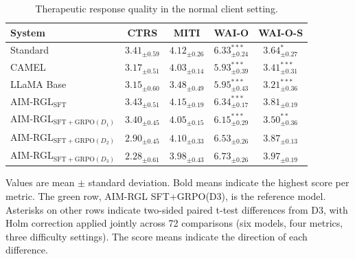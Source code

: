 \begin{table}[H]
\centering
\caption{Therapeutic response quality in the normal client setting.}
\label{tab:main-results-normal}
\small
\setlength{\tabcolsep}{4pt}
\renewcommand{\arraystretch}{1.15}
\begin{tabular}{lcccc}
\toprule
System & CTRS & MITI & WAI-O & WAI-O-S \\
\midrule
Standard & $3.41_{\pm 0.59}$ & $4.12_{\pm 0.26}$ & $6.33_{\pm 0.24}^{***}$ & $3.64_{\pm 0.27}^{*}$ \\
CAMEL & $3.17_{\pm 0.51}$ & $4.03_{\pm 0.14}$ & $5.93_{\pm 0.39}^{***}$ & $3.41_{\pm 0.31}^{***}$ \\
LLaMA Base & $3.15_{\pm 0.60}$ & $3.48_{\pm 0.49}$ & $5.95_{\pm 0.43}^{***}$ & $3.21_{\pm 0.36}^{***}$ \\
AIM-RGL$_{\mathrm{SFT}}$ & $\mathbf{3.43}_{\pm 0.51}$ & $\mathbf{4.15}_{\pm 0.19}$ & $6.34_{\pm 0.17}^{***}$ & $3.81_{\pm 0.19}$ \\
AIM-RGL$_{\mathrm{SFT+GRPO}(D_1)}$ & $3.40_{\pm 0.45}$ & $4.05_{\pm 0.15}$ & $6.15_{\pm 0.29}^{***}$ & $3.50_{\pm 0.36}^{**}$ \\
AIM-RGL$_{\mathrm{SFT+GRPO}(D_2)}$ & $2.90_{\pm 0.45}$ & $4.10_{\pm 0.33}$ & $6.53_{\pm 0.26}$ & $3.87_{\pm 0.13}$ \\
\rowcolor{green!15}
AIM-RGL$_{\mathrm{SFT+GRPO}(D_3)}$ & $2.28_{\pm 0.61}$ & $3.98_{\pm 0.43}$ & $\mathbf{6.73}_{\pm 0.26}$ & $\mathbf{3.97}_{\pm 0.19}$ \\
\bottomrule
\end{tabular}
\par\smallskip
\begin{minipage}{\textwidth}
\footnotesize
\linespread{1.1}\selectfont
Values are mean $\pm$ standard deviation. Bold means indicate the highest score per metric. The green row, AIM-RGL SFT+GRPO(D3), is the reference model. Asterisks on other rows indicate two-sided paired t-test differences from D3, with Holm correction applied jointly across 72 comparisons (six models, four metrics, three difficulty settings). The score means indicate the direction of each difference.
\end{minipage}
\end{table}

